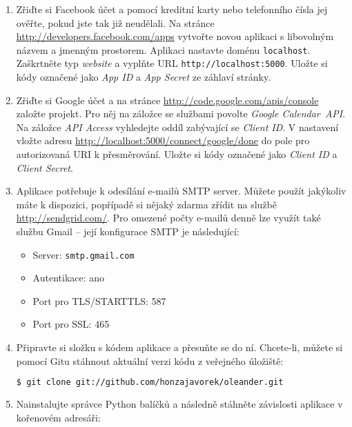\documentclass[12pt,oneside,final]{fithesis2}
\begin{document}
\begin{enumerate}
    \item Zřiďte si Facebook účet a pomocí kreditní karty nebo telefonního čísla jej ověřte, pokud jste tak již neudělali. Na stránce \url{http://developers.facebook.com/apps} vytvořte novou aplikaci s libovolným názvem a jmenným prostorem. Aplikaci nastavte doménu {\tt localhost}. Zaškrtněte typ \emph{website} a vyplňte URL {\tt http://localhost:5000}. Uložte si kódy označené jako \emph{App ID} a \emph{App Secret} ze záhlaví stránky.

    \item Zřiďte si Google účet a na stránce \url{http://code.google.com/apis/console} založte projekt. Pro něj na záložce se službami povolte \emph{Google Calendar~API}. Na záložce \emph{API Access} vyhledejte oddíl zabývající se \emph{Client ID}. V nastavení vložte adresu \url{http://localhost:5000/connect/google/done} do pole pro autorizovaná URI k přesměrování. Uložte si kódy označené jako \emph{Client ID} a \emph{Client Secret}.

    \item Aplikace potřebuje k odesílání e-mailů SMTP server. Můžete použít jakýkoliv máte k dispozici, popřípadě si nějaký zdarma zřídit na službě \url{http://sendgrid.com/}. Pro omezené počty e-mailů denně lze využít také službu Gmail -- její konfigurace SMTP je následující:

        \begin{itemize}
            \item Server: {\tt smtp.gmail.com}
            \item Autentikace: ano
            \item Port pro TLS/STARTTLS: 587
            \item Port pro SSL: 465
        \end{itemize}

    \item Připravte si složku s kódem aplikace a přesuňte se do ní. Chcete-li, můžete si pomocí Gitu stáhnout aktuální verzi kódu z veřejného úložiště:

        \begin{lstlisting}[language=bash]
$ git clone git://github.com/honzajavorek/oleander.git
        \end{lstlisting}

    \item Nainstalujte správce Python balíčků a následně stáhněte závislosti aplikace v kořenovém adresáři:


\end{enumerate}
\end{document}
